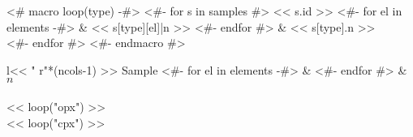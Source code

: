 <# macro loop(type) -#>
  <#- for s in samples #>
    << s.id >>
    <#- for el in elements -#>
    & << s[type][el]|n >>
    <#- endfor #> & << s[type].n >> \\
  <#- endfor #>
<#- endmacro #>
\begin{tabular}{l<< " r"*(ncols-1) >>}
\hline
  Sample
  <#- for el in elements -#>
  & 
  <#- endfor #> & $n$ \\
\hline
{} \\
\hline
<< loop("opx") >>
\hline
{} \\
\hline
<< loop("cpx") >>
\hline
\end{tabular}


